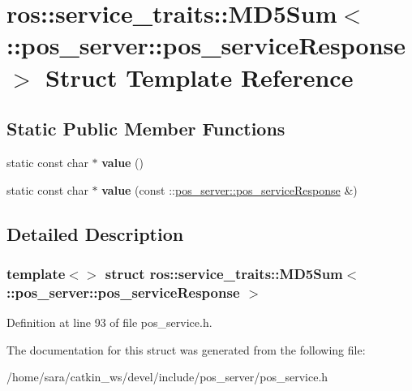 \hypertarget{structros_1_1service__traits_1_1MD5Sum_3_01_1_1pos__server_1_1pos__serviceResponse_01_4}{}\section{ros\+:\+:service\+\_\+traits\+:\+:M\+D5\+Sum$<$ \+:\+:pos\+\_\+server\+:\+:pos\+\_\+service\+Response $>$ Struct Template Reference}
\label{structros_1_1service__traits_1_1MD5Sum_3_01_1_1pos__server_1_1pos__serviceResponse_01_4}
\subsection*{Static Public Member Functions}
\begin{DoxyCompactItemize}
\item 
\mbox{\label{structros_1_1service__traits_1_1MD5Sum_3_01_1_1pos__server_1_1pos__serviceResponse_01_4_ae1f174b1ad068665a9205db330367098}} 
static const char $\ast$ {\bfseries value} ()
\item 
\mbox{\label{structros_1_1service__traits_1_1MD5Sum_3_01_1_1pos__server_1_1pos__serviceResponse_01_4_aef7cd95850c37af5ed1ce78278ff87f3}} 
static const char $\ast$ {\bfseries value} (const \+::\hyperlink{structpos__server_1_1pos__serviceResponse__}{pos\+\_\+server\+::pos\+\_\+service\+Response} \&)
\end{DoxyCompactItemize}


\subsection{Detailed Description}
\subsubsection*{template$<$$>$\newline
struct ros\+::service\+\_\+traits\+::\+M\+D5\+Sum$<$ \+::pos\+\_\+server\+::pos\+\_\+service\+Response $>$}



Definition at line 93 of file pos\+\_\+service.\+h.



The documentation for this struct was generated from the following file\+:\begin{DoxyCompactItemize}
\item 
/home/sara/catkin\+\_\+ws/devel/include/pos\+\_\+server/pos\+\_\+service.\+h\end{DoxyCompactItemize}
